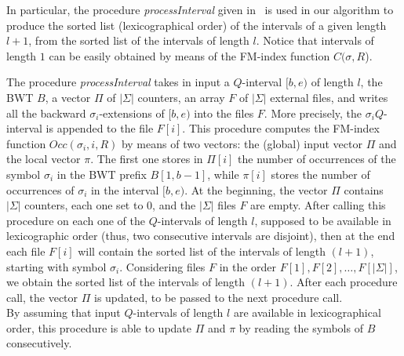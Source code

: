\documentclass[runningheads,envcountsame,a4paper]{llncs}
\begin{document}
In particular, the procedure \emph{processInterval} given
in~\cite{Cox2012} is used in our algorithm to produce the sorted list
(lexicographical order) of the intervals of a given length $l+1$, from the
sorted list of the intervals of length $l$. Notice that intervals of length $1$
can be easily obtained by means of the FM-index function $C(\sigma, R$).

The procedure \emph{processInterval} takes in input a $Q$-interval $[b,e)$ of length $l$, the BWT $B$, a vector $\Pi$ of $|\Sigma|$ counters, an array $F$ of $|\Sigma|$ external files, and writes all the backward $\sigma_i$-extensions of $[b,e)$ into the files $F$. More precisely, the $\sigma_i Q$-interval is appended to the file $F[i]$. This procedure computes the FM-index function $Occ(\sigma_i, i, R)$ by means of two vectors: the (global) input vector $\Pi$ and the local vector $\pi$. The first one stores in $\Pi[i]$ the number of occurrences of  the symbol $\sigma_i$ in the BWT prefix $B[1,b-1]$, while $\pi[i]$ stores the number of occurrences of $\sigma_i$ in the interval $[b,e)$. At the beginning, the vector $\Pi$ contains $|\Sigma|$ counters, each one set to $0$, and the $|\Sigma|$ files $F$ are empty.
After calling this procedure on each one of the $Q$-intervals of length $l$, supposed to be available in lexicographic order (thus, two consecutive intervals are disjoint), then  at the end each file $F[i]$ will contain the sorted list of the intervals of length $(l+1)$, starting with symbol $\sigma_i$. Considering files $F$ in the order $F[1], F[2], \ldots ,F[|\Sigma|]$, we obtain the sorted list of the intervals of length $(l+1)$. After each procedure call, the vector $\Pi$ is updated, to be passed to the next procedure call.\\
By assuming that input $Q$-intervals of length $l$ are available in lexicographical order, this procedure is able to update $\Pi$ and $\pi$ by reading the symbols of $B$ consecutively.
\end{document}
